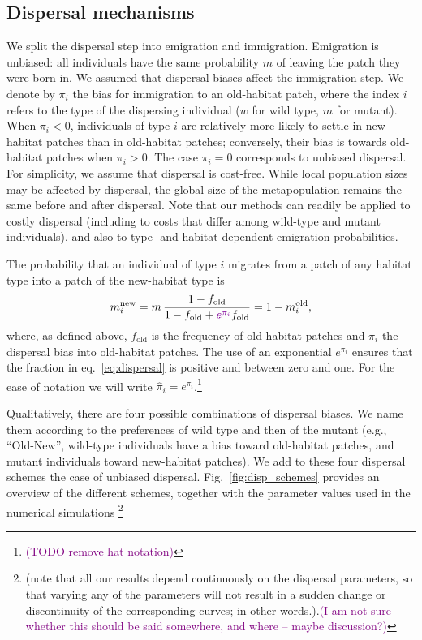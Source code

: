 \documentclass[11pt]{article}
\newcommand{\florence}[1]{\textcolor{purple}{(#1)}} %
\newcommand{\chg}[1]{\textcolor{change}{#1}}
\begin{document}
\subsection*{Dispersal mechanisms}

We split the dispersal step into emigration and immigration. Emigration is unbiased: all individuals have the same probability $m$ of leaving the patch they were born in. We assumed that dispersal biases affect the immigration step. 
We denote by $\pi_{i}$ the bias for immigration to an old-habitat patch, where the index $i$ refers to the type of the dispersing individual ($w$ for wild type, $m$ for mutant). When $\pi_i<0$, individuals of type $i$ are relatively more likely to settle in new-habitat patches than in old-habitat patches; conversely, their bias is towards old-habitat patches when $\pi_i>0$. The case $\pi_i=0$ corresponds to unbiased dispersal. 
For simplicity, we assume that dispersal is cost-free. While local population sizes may be affected by dispersal, the global size of the metapopulation remains the same before and after dispersal.  Note that our methods can readily be applied to costly dispersal (including to costs that differ among wild-type and mutant individuals), and also to type- and habitat-dependent emigration probabilities. 

The probability that an individual of type $i$ migrates from a patch of any habitat type into a patch of the new-habitat type is
%
\begin{equation}\label{eq:dispersal}
\begin{aligned}
m_i^{\text{new}} &= m\, \frac{1-f_{\text{old}}}{1-f_{\text{old}}+\chg{e^{\pi_i}} f_{\text{old}}} = 1-m_i^{\text{old}},\\
\end{aligned}
\end{equation}
where, as defined above, $f_{\text{old}}$ is the frequency of old-habitat patches and $\pi_i$ the dispersal bias into old-habitat patches. The use of an exponential $e^{\pi_i}$  ensures that the fraction in eq.~\eqref{eq:dispersal} is positive and between zero and one. For the ease of notation we will write $\widehat{\pi}_i=e^{\pi_i}$.\footnote{\florence{TODO remove hat notation}}

Qualitatively, there are four possible combinations of dispersal biases. We name them according to the preferences of wild type and then of the mutant (e.g., ``Old-New'', wild-type individuals have a bias toward old-habitat patches, and mutant individuals toward new-habitat patches). We add to these four dispersal schemes the case of unbiased dispersal. Fig.~\ref{fig:disp_schemes} provides an overview of the different schemes, together with the parameter values used in the numerical simulations \footnote{(note that all our results depend continuously on the dispersal parameters, so that varying any of the parameters will not result in a sudden change or discontinuity of the corresponding curves; in other words.).\florence{I am not sure whether this should be said somewhere, and where -- maybe discussion?}} 
\end{document}
